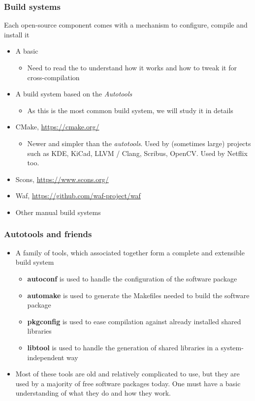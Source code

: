 \begin{frame}
  \frametitle{Build systems}
  Each open-source component comes with a mechanism to
  configure, compile and install it
  \begin{itemize}
  \item A basic 
    \begin{itemize}
    \item Need to read the  to understand how it
      works and how to tweak it for cross-compilation
    \end{itemize}
  \item A build system based on the {\em Autotools}
    \begin{itemize}
    \item As this is the most common build system, we will study it
      in details
    \end{itemize}
  \item CMake, \url{https://cmake.org/}
    \begin{itemize}
    \item Newer and simpler than the {\em autotools}. Used by
    (sometimes large) projects such as KDE, KiCad, LLVM / Clang,
    Scribus, OpenCV. Used by Netflix too.
    \end{itemize}
  \item Scons, \url{https://www.scons.org/}
  \item Waf, \url{https://github.com/waf-project/waf}
  \item Other manual build systems
  \end{itemize}
\end{frame}

\begin{frame}
  \frametitle{Autotools and friends}
  \begin{itemize}
  \item A family of tools, which associated together form a complete
    and extensible build system
    \begin{itemize}
    \item {\bf autoconf} is used to handle the configuration of the
      software package
    \item {\bf automake} is used to generate the Makefiles needed to
      build the software package
    \item {\bf pkgconfig} is used to ease compilation against already
      installed shared libraries
    \item {\bf libtool} is used to handle the generation of shared
      libraries in a system-independent way
    \end{itemize}
  \item Most of these tools are old and relatively complicated to use,
    but they are used by a majority of free software packages
    today. One must have a basic understanding of what they do and how
    they work.
  \end{itemize}
\end{frame}

